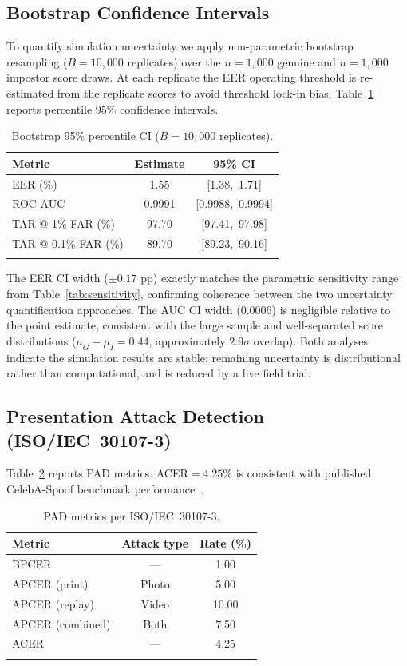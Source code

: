 \documentclass[pdflatex,sn-mathphys-num]{sn-jnl}%
\theoremstyle{thmstyleone}%
\theoremstyle{thmstyletwo}%
\theoremstyle{thmstylethree}%
\begin{document}
\subsection{Bootstrap Confidence Intervals}\label{sec:bootstrap}

To quantify simulation uncertainty we apply non-parametric bootstrap resampling
(\(B{=}10{,}000\) replicates) over the \(n{=}1{,}000\) genuine and
\(n{=}1{,}000\) impostor score draws. At each replicate the EER operating
threshold is re-estimated from the replicate scores to avoid threshold lock-in
bias. Table~\ref{tab:bootstrap_ci} reports percentile 95\% confidence intervals.

\begin{table}[t]
\caption{Bootstrap 95\% percentile CI (\(B{=}10{,}000\) replicates).}
\label{tab:bootstrap_ci}%
\begin{tabular}{@{}lcc@{}}
  \toprule
  Metric & Estimate & 95\% CI \\
  \midrule
  EER (\%)            & 1.55   & [1.38,\ 1.71] \\
  ROC AUC             & 0.9991 & [0.9988,\ 0.9994] \\
  TAR @ 1\% FAR (\%)  & 97.70  & [97.41,\ 97.98] \\
  TAR @ 0.1\% FAR (\%)& 89.70  & [89.23,\ 90.16] \\
  \botrule
\end{tabular}
\end{table}

The EER CI width (\(\pm 0.17\) pp) exactly matches the parametric sensitivity
range from Table~\ref{tab:sensitivity}, confirming coherence between the two
uncertainty quantification approaches. The AUC CI width (0.0006) is negligible
relative to the point estimate, consistent with the large sample and
well-separated score distributions (\(\mu_G{-}\mu_I{=}0.44\), approximately
\(2.9\sigma\) overlap). Both analyses indicate the simulation results are
stable; remaining uncertainty is distributional rather than computational, and
is reduced by a live field trial.

\subsection{Presentation Attack Detection (ISO/IEC~30107-3)}

Table~\ref{tab:pad} reports PAD metrics. ACER\(=4.25\%\) is consistent with
published CelebA-Spoof benchmark performance~\cite{zhang2020minifasnet}.

\begin{table}[t]
\caption{PAD metrics per ISO/IEC~30107-3.}
\label{tab:pad}%
\begin{tabular}{@{}lcc@{}}
  \toprule
  Metric & Attack type & Rate (\%) \\
  \midrule
  BPCER & ---    & 1.00 \\
  APCER (print)    & Photo & 5.00 \\
  APCER (replay)   & Video & 10.00 \\
  APCER (combined) & Both  & 7.50 \\
  ACER  & ---    & 4.25 \\
  \botrule
\end{tabular}
\end{table}
\end{document}
